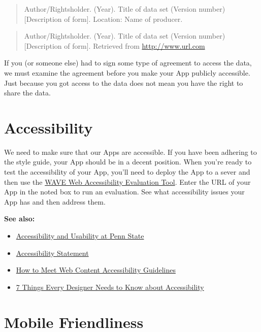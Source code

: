 \documentclass[]{book}
\providecommand{\tightlist}{%
  \setlength{\itemsep}{0pt}\setlength{\parskip}{0pt}}
\begin{document}
\begin{quote}
Author/Rightsholder. (Year). Title of data set (Version number) {[}Description of form{]}. Location: Name of producer.
\end{quote}

\begin{quote}
Author/Rightsholder. (Year). Title of data set (Version number) {[}Description of form{]}. Retrieved from \url{http://www.url.com}
\end{quote}

If you (or someone else) had to sign some type of agreement to access the data, we must examine the agreement before you make your App publicly accessible. Just because you got access to the data does not mean you have the right to share the data.

\hypertarget{accessibility}{%
\chapter{Accessibility}\label{accessibility}}

We need to make sure that our Apps are accessible. If you have been adhering to the style guide, your App should be in a decent position. When you're ready to test the accessibility of your App, you'll need to deploy the App to a sever and then use the \href{https://wave.webaim.org/}{WAVE Web Accessibility Evaluation Tool}. Enter the URL of your App in the noted box to run an evaluation. See what accessibility issues your App has and then address them.

\textbf{See also:}

\begin{itemize}
\tightlist
\item
  \href{https://accessibility.psu.edu/}{Accessibility and Usability at Penn
  State}
\item
  \href{https://www.psu.edu/accessibilitystatement}{Accessibility
  Statement}
\item
  \href{https://www.w3.org/WAI/WCAG21/quickref/}{How to Meet Web Content Accessibility
  Guidelines}
\item
  \href{https://medium.com/salesforce-ux/7-things-every-designer-needs-to-know-about-accessibility-64f105f0881b}{7 Things Every Designer Needs to Know about Accessibility}
\end{itemize}

\hypertarget{mobile}{%
\chapter{Mobile Friendliness}\label{mobile}}
\end{document}
